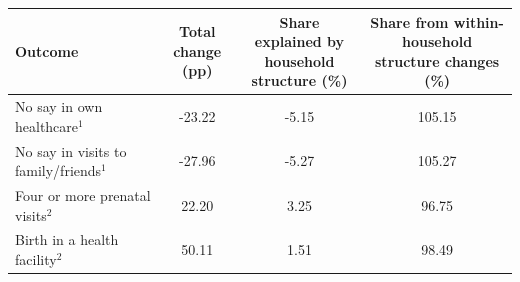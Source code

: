 \begin{tabular}{lccc}
\toprule
Outcome & \makecell{Total change\\(pp)} & \makecell{Share explained by \\household structure (\%)} & \makecell{Share from within-\\household structure changes (\%)} \\
\midrule
No say in own healthcare$^1$&-23.22&-5.15&105.15\\
No say in visits to family/friends$^1$&-27.96&-5.27&105.27\\
Four or more prenatal visits$^2$&22.20&3.25&96.75\\
Birth in a health facility$^2$&50.11&1.51&98.49\\
\bottomrule
\end{tabular}
